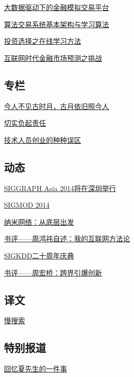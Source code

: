 \documentclass[a4paper]{article}
\begin{document}
\href{http://history.ccf.org.cn/resources/1190201776262/2014/10/13/9.pdf}{大数据驱动下的金融模拟交易平台}

\href{http://history.ccf.org.cn/resources/1190201776262/2014/10/13/10.pdf}{算法交易系统基本架构与学习算法}

\href{http://history.ccf.org.cn/resources/1190201776262/2014/10/13/11.pdf}{投资选择之在线学习方法}

\href{http://history.ccf.org.cn/resources/1190201776262/2014/10/13/12.pdf}{互联网时代金融市场预测之挑战}

\subsection{专栏}
\href{http://history.ccf.org.cn/resources/1190201776262/2014/10/13/15.pdf}{今人不见古时月，古月依旧照今人}

\href{http://history.ccf.org.cn/resources/1190201776262/2014/10/13/16.pdf}{切实负起责任}

\href{http://history.ccf.org.cn/resources/1190201776262/2014/10/13/14.pdf}{技术人员创业的种种误区}

\subsection{动态}
\href{http://history.ccf.org.cn/resources/1190201776262/2014/10/13/22.pdf}{SIGGRAPH Asia 2014将在深圳举行}

\href{http://history.ccf.org.cn/resources/1190201776262/2014/10/13/19.pdf}{SIGMOD 2014}

\href{http://history.ccf.org.cn/resources/1190201776262/2014/10/14/nami.pdf}{纳米网络：从底层出发}

\href{http://history.ccf.org.cn/resources/1190201776262/2014/10/13/20.pdf}{书评——周鸿祎自述：我的互联网方法论}

\href{http://history.ccf.org.cn/resources/1190201776262/2014/10/13/17.pdf}{SIGKDD二十周年庆典}

\href{http://history.ccf.org.cn/resources/1190201776262/2014/10/13/21.pdf}{书评——周宏桥：跨界引爆创新}

\subsection{译文}
\href{http://history.ccf.org.cn/resources/1190201776262/2014/10/13/23.pdf}{慢搜索}

\subsection{特别报道}
\href{http://history.ccf.org.cn/resources/1190201776262/2014/10/13/2.pdf}{回忆夏先生的一件事}
\end{document}

